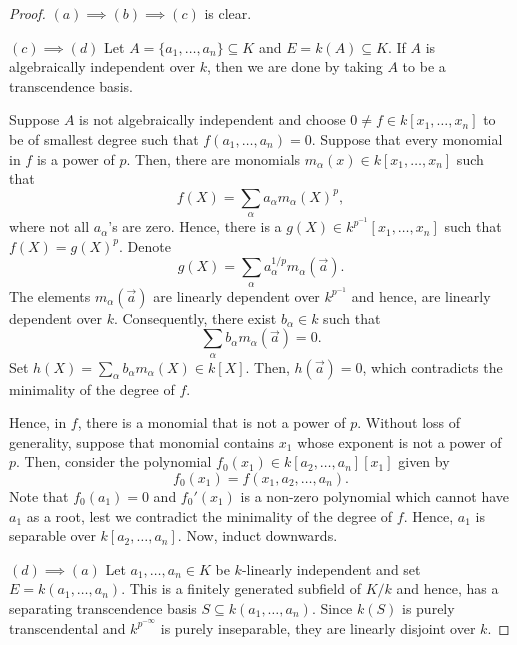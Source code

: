 \begin{proof}
    $(a)\implies(b)\implies(c)$ is clear.

    $(c)\implies(d)$ Let $A = \{a_1,\dots, a_n\}\subseteq K$ and $E = k(A)\subseteq K$. If $A$ is algebraically independent over $k$, then we are done by taking $A$ to be a transcendence basis. 

    Suppose $A$ is not algebraically independent and choose $0\ne f\in k[x_1,\dots,x_n]$ to be of smallest degree such that $f(a_1,\dots,a_n) = 0$. Suppose that every monomial in $f$ is a power of $p$. Then, there are monomials $m_\alpha(x)\in k[x_1,\dots,x_n]$ such that 
    \begin{equation*}
        f(X) = \sum_{\alpha} a_\alpha m_\alpha(X)^p,
    \end{equation*}
    where not all $a_\alpha$'s are zero. Hence, there is a $g(X)\in k^{p^{-1}}[x_1,\dots,x_n]$ such that $f(X) = g(X)^p$. Denote 
    \begin{equation*}
        g(X) = \sum_{\alpha} a_\alpha^{1/p} m_\alpha(\vec a).
    \end{equation*}
    The elements $m_\alpha(\vec a)$ are linearly dependent over $k^{p^{-1}}$ and hence, are linearly dependent over $k$. Consequently, there exist $b_\alpha\in k$ such that 
    \begin{equation*}
        \sum_{\alpha} b_\alpha m_\alpha(\vec a) = 0.
    \end{equation*}
    Set $h(X) = \sum_\alpha b_\alpha m_\alpha(X)\in k[X]$. Then, $h(\vec a) = 0$, which contradicts the minimality of the degree of $f$.

    Hence, in $f$, there is a monomial that is not a power of $p$. Without loss of generality, suppose that monomial contains $x_1$ whose exponent is not a power of $p$. Then, consider the polynomial $f_0(x_1)\in k[a_2,\dots,a_n][x_1]$ given by 
    \begin{equation*}
        f_0(x_1) = f(x_1,a_2,\dots,a_n).
    \end{equation*}
    Note that $f_0(a_1) = 0$ and $f_0'(x_1)$ is a non-zero polynomial which cannot have $a_1$ as a root, lest we contradict the minimality of the degree of $f$. Hence, $a_1$ is separable over $k[a_2,\dots,a_n]$. Now, induct downwards.

    $(d)\implies(a)$ Let $a_1,\dots,a_n\in K$ be $k$-linearly independent and set $E = k(a_1,\dots,a_n)$. This is a finitely generated subfield of $K/k$ and hence, has a separating transcendence basis $S\subseteq k(a_1,\dots,a_n)$. Since $k(S)$ is purely transcendental and $k^{p^{-\infty}}$ is purely inseparable, they are linearly disjoint over $k$. 


\end{proof}
